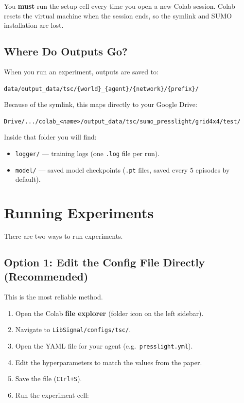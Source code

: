 \documentclass[11pt,a4paper]{article}
\begin{document}
\begin{warningbox}
You \textbf{must} run the setup cell every time you open a new Colab session.
Colab resets the virtual machine when the session ends, so the symlink and SUMO installation are lost.
\end{warningbox}

\subsection{Where Do Outputs Go?}

When you run an experiment, outputs are saved to:
\begin{center}
\texttt{data/output\_data/tsc/\{world\}\_\{agent\}/\{network\}/\{prefix\}/}
\end{center}

Because of the symlink, this maps directly to your Google Drive:
\begin{center}
\texttt{Drive/.../colab\_\textit{<name>}/output\_data/tsc/sumo\_presslight/grid4x4/test/}
\end{center}

Inside that folder you will find:
\begin{itemize}
    \item \texttt{logger/} --- training logs (one \texttt{.log} file per run).
    \item \texttt{model/} --- saved model checkpoints (\texttt{.pt} files, saved every 5 episodes by default).
\end{itemize}

\section{Running Experiments}

There are two ways to run experiments.

\subsection{Option 1: Edit the Config File Directly (Recommended)}

This is the most reliable method.

\begin{enumerate}
    \item Open the Colab \textbf{file explorer} (folder icon on the left sidebar).
    \item Navigate to \texttt{LibSignal/configs/tsc/}.
    \item Open the YAML file for your agent (e.g.\ \texttt{presslight.yml}).
    \item Edit the hyperparameters to match the values from the paper.
    \item Save the file (\texttt{Ctrl+S}).
    \item Run the experiment cell:
\end{enumerate}
\end{document}
